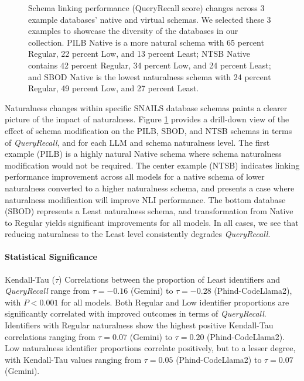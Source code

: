 \begin{figure}
\begin{subfigure}{\figwidthmod\linewidth}
  \end{subfigure}
  \caption{Schema linking performance (QueryRecall score) changes across 3 example databases' native and virtual schemas. We selected these 3 examples to showcase the diversity of the databases in our collection. PILB Native is a more natural schema with 65 percent Regular, 22 percent Low, and 13 percent Least; NTSB Native contains 42 percent Regular, 34 percent Low, and 24 percent Least; and SBOD Native is the lowest naturalness schema with 24 percent Regular, 49 percent Low, and 27 percent Least.}
  \label{fig:recall-boxplot-dbs}
\end{figure}

Naturalness changes within specific SNAILS database schemas paints a clearer picture of the impact of naturalness.
Figure \ref{fig:recall-boxplot-dbs} provides a drill-down view of the effect of schema modification on the PILB, SBOD, and NTSB schemas in terms of \emph{QueryRecall}, and for each LLM and schema naturalness level.
The first example (PILB) is a highly natural Native schema where schema naturalness modification would not be required. The center example (NTSB) indicates linking performance improvement across all models for a native schema of lower naturalness converted to a higher naturalness schema, and presents a case where naturalness modification will improve NLI performance. The bottom database (SBOD) represents a Least naturalness schema, and transformation from Native to Regular yields significant improvements for all models. In all cases, we see that reducing naturalness to the Least level consistently degrades \emph{QueryRecall}. 

\paragraph{\textbf{Statistical Significance}}
Kendall-Tau ($\tau$) Correlations between the proportion of Least identifiers and \emph{QueryRecall} range from $\tau=-0.16$ (Gemini) to $\tau=-0.28$ (Phind-CodeLlama2), with $P < 0.001$ for all models.
Both Regular and Low identifier proportions are significantly correlated with improved outcomes in terms of \emph{QueryRecall}.
Identifiers with Regular naturalness show the highest positive Kendall-Tau correlations ranging from $\tau=0.07$ (Gemini) to $\tau=0.20$ (Phind-CodeLlama2).
Low naturalness identifier proportions correlate positively, but to a lesser degree, with Kendall-Tau values ranging from $\tau=0.05$ (Phind-CodeLlama2) to $\tau=0.07$ (Gemini).

